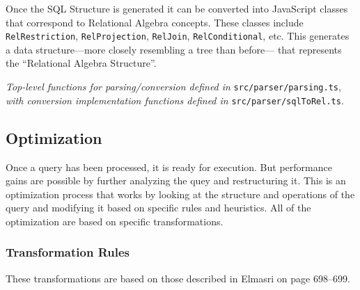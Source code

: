 \documentclass{article}
\begin{document}
Once the SQL Structure is generated it can be converted into JavaScript classes
that correspond to Relational Algebra concepts.
These classes include \verb|RelRestriction|, \verb|RelProjection|,
\verb|RelJoin|, \verb|RelConditional|, etc.
This generates a data structure---more closely resembling a tree than before---
that represents the ``Relational Algebra Structure''.

\emph{Top-level functions for parsing/conversion defined in} \verb|src/parser/parsing.ts|,
\emph{with conversion implementation functions defined in} \verb|src/parser/sqlToRel.ts|.

\pagebreak

\subsection{Optimization}

Once a query has been processed, it is ready for execution. But performance
gains are possible by further analyzing the quey and restructuring it.
This is an optimization process that works by looking at the structure and
operations  of the query and modifying it based on specific rules and
heuristics. All of the optimization are based on specific transformations.

\subsubsection{Transformation Rules}

These transformations are based on those described in Elmasri on page 698--699.
\end{document}
